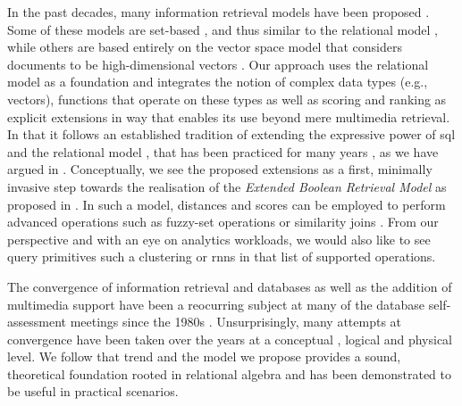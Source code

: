 In the past decades, many information retrieval models have been proposed \cite{Umano:1983Retrieval,Salton:1983Extended,Wong:1985Generalized}. Some of these models are set-based \cite{Salton:1983Extended,Umano:1983Retrieval}, and thus similar to the relational model \cite{Codd:1970Relational}, while others are based entirely on the vector space model that considers documents to be high-dimensional vectors \cite{Wong:1985Generalized}. Our approach uses the relational model as a foundation and integrates the notion of complex data types (e.g., vectors), functions that operate on these types as well as scoring and ranking as explicit extensions in way that enables its use beyond mere multimedia retrieval. In that it follows an established tradition of extending the expressive power of \acrshort{sql} and the relational model \cite{Libkin:2003Expressive}, that has been practiced for many years \cite{Chengkai:2005RankSQL,Zhang:2006Boolean,Belohlavek:2007Relational}, as we have argued in . Conceptually, we see the proposed extensions as a first, minimally invasive step towards the realisation of the \emph{Extended Boolean Retrieval Model} as proposed in \cite{Salton:1983Extended}. In such a model, distances and scores can be employed to perform advanced operations such as fuzzy-set operations or similarity joins \cite{Umano:1983Retrieval,Zadeh:1996Fuzzy,Bohm:2001Fast}. From our perspective and with an eye on analytics workloads, we would also like to see query primitives such a clustering or \acrshort{rnns} \cite{Korn:2000Influence} in that list of supported operations.

The convergence of information retrieval and databases as well as the addition of multimedia support have been a reocurring subject at many of the database self-assessment meetings since the 1980s \cite{Agrawal:2008Claremont}. Unsurprisingly, many attempts at convergence have been taken over the years at a conceptual \cite{Marcus:1996Foundations,Adjeroh:1997Multimedia,Watanabe:1998Multimedia}, logical \cite{Zhang:2006Boolean,Belohlavek:2007Relational} and physical \cite{Silva:2010SimDB,Giangreco:2014Adam,Whang:2015DB,Giangreco:2016Adam,Yang:2020Pase} level. We follow that trend and the model we propose provides a sound, theoretical foundation rooted in relational algebra and has been demonstrated to be useful in practical scenarios. 

